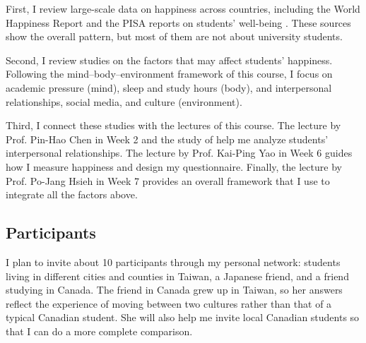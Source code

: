 \documentclass[12pt,a4paper]{article}
\begin{document}
First, I review large-scale data on happiness across countries, including the World Happiness Report \parencite{helliwell2026world, whr2026ch1} and the PISA reports on students' well-being \parencite{oecd2019pisa}. 
These sources show the overall pattern, but most of them are not about university students.

Second, I review studies on the factors that may affect students' happiness. 
Following the mind--body--environment framework of this course, I focus on academic pressure (mind), sleep and study hours (body), and interpersonal relationships, social media, and culture (environment).

Third, I connect these studies with the lectures of this course. The lecture by Prof. Pin-Hao Chen in Week 2 and the study of \parencite{morelli2017empathy} help me analyze students' interpersonal
relationships. The lecture by Prof. Kai-Ping Yao in Week 6 guides how I
measure happiness and design my questionnaire. Finally, the lecture by
Prof. Po-Jang Hsieh in Week 7 provides an overall framework that I use to
integrate all the factors above.

\subsection{Participants}
I plan to invite about 10 participants through my personal network:
students living in different cities and counties in Taiwan, a Japanese friend, and a friend studying in Canada. 
The friend in Canada grew up in Taiwan, so her answers reflect the experience of moving between two cultures rather than that of a typical Canadian student. 
She will also help me invite local Canadian students so that I can do a more complete comparison.
\end{document}
